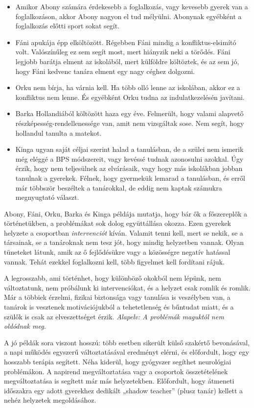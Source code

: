 \begin{itemize}
\tightlist
\item
  Amikor Abony számára érdekesebb a foglalkozás, vagy kevesebb gyerek
  van a foglalkozáson, akkor Abony nagyon el tud mélyülni. Abonynak
  egyébként a foglalkozás előtti sport sokat segít.
\item
  Fáni apukája épp elköltözött. Régebben Fáni mindig a
  konfliktus-elsimító volt. Valószínűleg ez sem segít most, mert
  hiányzik neki a törődés. Fáni legjobb barátja elment az iskolából, mert
  külföldre költöztek, és az sem jó, hogy Fáni kedvenc tanára elment egy
  nagy céghez dolgozni.
\item
  Orku nem bírja, ha várnia kell. Ha több olló lenne az iskolában, akkor
  ez a konfliktus nem lenne. És egyébként Orku tudna az
  indulatkezelésén javítani.
\item
  Barka Hollandiából költözött haza egy éve. Felmerült, hogy valami alapvető
  részképesség-rendellenessége van, amit nem vizsgáltak sose. Nem segít,
  hogy hollandul tanulta a matekot.
\item
  Kinga ugyan saját céljai szerint halad a tanulásban, de a szülei nem
  ismerik még eléggé a BPS módszereit, vagy kevéssé tudnak azonosulni
  azokkal. Úgy érzik, hogy nem teljesülnek az elvárásaik, vagy hogy más
  iskolákban jobban tanulnak a gyerekek. Félnek, hogy\break
  gyermekük lemarad
  a tanulásban, és erről már többször beszéltek a tanárokkal, de eddig
  nem kaptak számukra megnyugtató választ.
\end{itemize}

Abony, Fáni, Orku, Barka és Kinga példája mutatja, hogy bár ők a
főszereplők a történetükben, a problémákat sok dolog együttállása okozza.
Ezen gyerekek helyzete a csoportban \emph{intervenciót} kíván. Valamit
tenni kell, mert se nekik, se a társainak, se a tanároknak nem tesz jót,
hogy mindig helyzetben vannak. Olyan tüneteket látunk, amik az ő
fejlődésükre vagy a közösségre negatív hatással vannak. Tehát ezekkel
foglalkozni kell, több figyelmet kell fordítani rájuk.

A legrosszabb, ami történhet, hogy különböző okokból nem lépünk, nem
változtatunk, nem próbálunk ki intervenciókat, és a helyzet csak
romlik és romlik. Már a többiek érzelmi, fizikai biztonsága vagy
tanulása is veszélyben van, a tanárok is vesztenek motivációjukból a
tehetetlenség és bűntudat miatt, és a szülők is csak az elveszettséget
érzik.
\emph{Alapelv: A problémák maguktól nem oldódnak meg.}

A jó példák sora viszont hosszú: több esetben sikerült külső szakértő
bevonásával, a napi működés egyszerű változtatásával eredményt elérni,
és előfordult, hogy egy hosszabb terápia segített. Néha kiderül, hogy
gyógyszer segíthet neurológiai problémákon. A napirend megváltoztatása vagy
a csoportok összetételének megváltoztatása is segített már más
helyzetekben. Előfordult, hogy átmeneti időszakra egy adott gyerekhez
dedikált „shadow teacher'' (plusz tanár) kellett a nehéz helyzetek
megoldásához.

